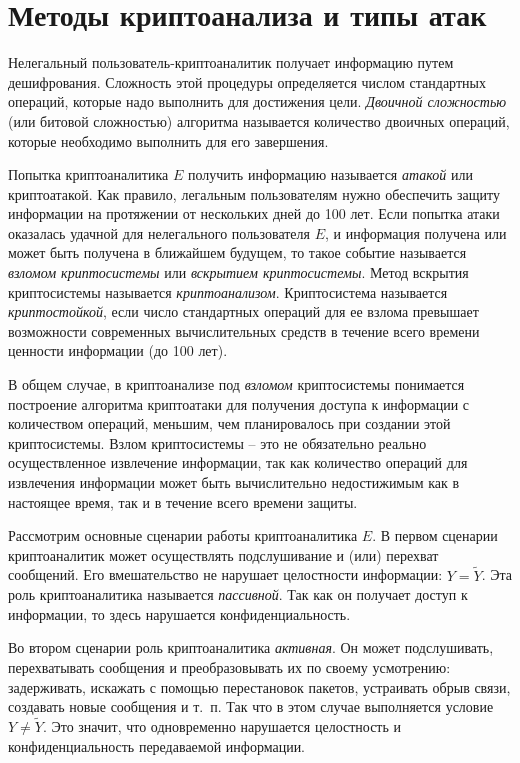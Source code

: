 \section{Методы криптоанализа и типы атак}

Нелегальный пользователь-криптоаналитик получает информацию путем дешифрования. Сложность этой процедуры определяется числом стандартных операций, которые надо выполнить для достижения цели. \emph{Двоичной сложностью} (или битовой сложностью) алгоритма называется количество двоичных операций, которые необходимо выполнить для его завершения.

Попытка криптоаналитика $E$ получить информацию называется \emph{атакой} или криптоатакой. Как правило, легальным пользователям нужно обеспечить защиту информации на протяжении от нескольких дней до 100 лет. Если попытка атаки оказалась удачной для нелегального пользователя $E$, и информация получена или может быть получена в ближайшем будущем, то такое событие называется  \emph{взломом криптосистемы} или \emph{вскрытием криптосистемы}. Метод вскрытия криптосистемы называется \emph{криптоанализом}. Криптосистема называется \emph{криптостойкой}, если число стандартных операций для ее взлома превышает возможности современных вычислительных средств в течение всего времени ценности информации (до 100 лет).

В общем случае, в криптоанализе под \emph{взломом} криптосистемы понимается построение алгоритма криптоатаки для получения доступа к информации с количеством операций, меньшим, чем планировалось при создании этой криптосистемы. Взлом криптосистемы -- это не обязательно реально осуществленное извлечение информации, так как количество операций для извлечения информации может быть вычислительно недостижимым как в настоящее время, так и в течение всего времени защиты.

Рассмотрим основные сценарии работы криптоаналитика $E$. В первом сценарии криптоаналитик может осуществлять подслушивание и (или) перехват сообщений. Его вмешательство не нарушает целостности информации: $Y=\widetilde{Y}$. Эта роль криптоаналитика называется \emph{пассивной}. Так как он получает доступ к информации, то здесь нарушается конфиденциальность.

Во втором сценарии роль криптоаналитика \emph{активная}. Он может подслушивать, перехватывать сообщения и преобразовывать их по своему усмотрению: задерживать, искажать с помощью перестановок пакетов, устраивать обрыв связи, создавать новые сообщения и т.~п. Так что в этом случае выполняется условие $Y \neq \widetilde{Y}$. Это значит, что одновременно нарушается целостность и конфиденциальность передаваемой информации.

